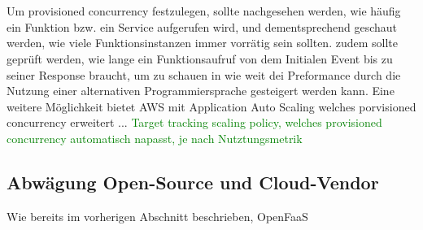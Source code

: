 \documentclass[11pt]{article}
\begin{document}
\cite{van2019spec}
\cite{Yussupov2019_SystematicMappingStudyFaaS}
\cite{lee2018evaluation}
\cite{aws2020ManagingFunctions}
\\\\
Um provisioned concurrency festzulegen, sollte nachgesehen werden, wie häufig ein Funktion bzw. ein Service aufgerufen wird, und dementsprechend geschaut werden, wie viele Funktionsinstanzen immer vorrätig sein sollten. zudem sollte geprüft werden, wie lange ein Funktionsaufruf von dem Initialen Event bis zu seiner Response braucht, um zu schauen in wie weit dei Preformance durch die Nutzung einer alternativen Programmiersprache gesteigert werden kann. 
Eine weitere Möglichkeit bietet AWS mit Application Auto Scaling welches porvisioned concurrency erweitert ... \textcolor{green}{Target tracking scaling policy, welches provisioned concurrency automatisch napasst, je nach Nutztungsmetrik}
\subsection{Abwägung Open-Source und Cloud-Vendor}
Wie bereits im vorherigen Abschnitt beschrieben, 
OpenFaaS  
\end{document}
